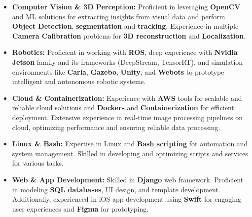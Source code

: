\documentclass[10pt]{res}
\begin{document}
\begin{resume}
\begin{itemize}
\item {\bf Computer Vision \& 3D Perception:} Proficient in leveraging \textbf{OpenCV} and ML solutions for extracting insights from visual data and perform \textbf{Object Detection}, \textbf{segmentation} and \textbf{tracking}. Experience in multiple \textbf{Camera Calibration} problems for \textbf{3D reconstruction} and \textbf{Localization}.

\item {\bf Robotics:} Proficient in working with \textbf{ROS}, deep experience with \textbf{Nvidia Jetson} family and its frameworks (DeepStream, TensorRT), and simulation environments like \textbf{Carla}, \textbf{Gazebo}, \textbf{Unity}, and \textbf{Webots} to prototype intelligent and autonomous robotic systems.

\item {\bf Cloud \& Containerization:} Experience with \textbf{AWS} tools for scalable and reliable cloud solutions and \textbf{Dockers} and \textbf{Containerization} for efficient deployment. Extensive experience in real-time image processing pipelines on cloud, optimizing performance and ensuring reliable data processing.

\item {\bf Linux \& Bash:} Expertise in Linux and \textbf{Bash scripting} for automation and system management. Skilled in developing and optimizing scripts and services for various tasks.

\item {\bf Web \& App Development:} Skilled in \textbf{Django} web framework. Proficient in modeling \textbf{SQL databases}, UI design, and template development. Additionally, experienced in iOS app development using \textbf{Swift} for engaging user experiences and \textbf{Figma} for prototyping.

\end{itemize}




\end{resume}
\end{document}
